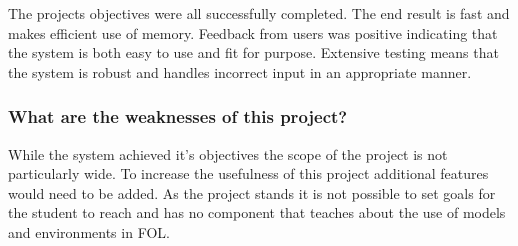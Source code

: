 \noindent The projects objectives were all successfully completed. The end result is fast and makes efficient use of memory. Feedback from users was positive indicating that the system is both easy to use and fit for purpose. Extensive testing means that the system is robust and handles incorrect input in an appropriate manner.

\subsubsection*{What are the weaknesses of this project?}

\noindent While the system achieved it's objectives the scope of the project is not particularly wide. To increase the usefulness of this project additional features would need to be added. As the project stands it is not possible to set goals for the student to reach and has no component that teaches about the use of models and environments in FOL.